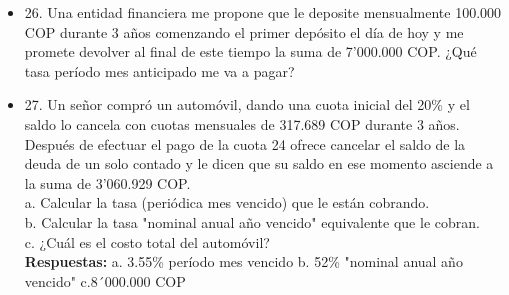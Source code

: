 \begin{itemize}
 \item 26. Una entidad financiera me propone que le deposite mensualmente 100.000 COP durante 3 años comenzando el primer depósito el día de hoy y me promete devolver al final de este tiempo la suma de 7'000.000 COP. ¿Qué tasa período mes anticipado me va a pagar?\\
       \medskip

 \item 27. Un señor compró un automóvil, dando una cuota inicial del 20\% y el saldo lo cancela con cuotas mensuales de 317.689 COP durante 3 años. Después de efectuar el pago de la cuota 24 ofrece cancelar el saldo de la deuda de un solo contado y le dicen que su saldo en ese momento asciende a la suma de 3'060.929 COP.\\
       a. Calcular la tasa (periódica mes vencido) que le están cobrando.\\
       b. Calcular la tasa "nominal anual año vencido" equivalente que le cobran.\\
       c. ¿Cuál es el costo total del automóvil?\\
       \textbf{Respuestas:} a. 3.55\% período mes vencido  \hspace{0,5cm} b. 52\% "nominal anual año vencido"  \hspace{0,5cm} c.8´000.000 COP

\end{itemize}\
